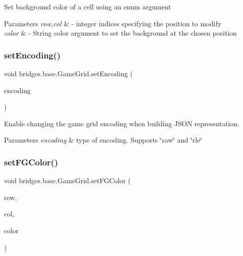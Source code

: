 Set background color of a cell using an enum argument


\begin{DoxyParams}{Parameters}
{\em row,col} & -\/ integer indices specifying the position to modify \\
\hline
{\em color} & -\/ String color argument to set the background at the chosen position \\
\hline
\end{DoxyParams}
\mbox{\label{classbridges_1_1base_1_1_game_grid_a2281cfd7d61dc9903c9b1358c9767a1e}} 
\subsubsection{\texorpdfstring{set\+Encoding()}{setEncoding()}}
{\footnotesize\ttfamily void bridges.\+base.\+Game\+Grid.\+set\+Encoding (\begin{DoxyParamCaption}\item[{String}]{encoding }\end{DoxyParamCaption})}



Enable changing the game grid encoding when building J\+S\+ON representation. 


\begin{DoxyParams}{Parameters}
{\em encoding} & type of encoding. Supports \char`\"{}raw\char`\"{} and \char`\"{}rle\char`\"{} \\
\hline
\end{DoxyParams}
\mbox{\label{classbridges_1_1base_1_1_game_grid_a105b46f68bcc9413889e7255318bab4c}} 
\subsubsection{\texorpdfstring{set\+F\+G\+Color()}{setFGColor()}\hspace{0.1cm}{\footnotesize\ttfamily [1/2]}}
{\footnotesize\ttfamily void bridges.\+base.\+Game\+Grid.\+set\+F\+G\+Color (\begin{DoxyParamCaption}\item[{Integer}]{row,  }\item[{Integer}]{col,  }\item[{\hyperlink{enumbridges_1_1base_1_1_named_color}{Named\+Color}}]{color }\end{DoxyParamCaption})}


